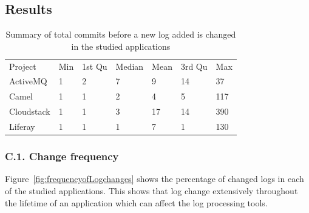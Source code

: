 %	



%	





\subsection{Results}

\begin{table}[tb]
	\centering
	\caption{Summary of total commits before a new log added is changed in the studied applications}
	
	\begin{tabular}{lllllll}
			\cline{1-7}
		Project    & Min & 1st Qu & Median & Mean & 3rd Qu & Max \\
		\cline{1-7}
		ActiveMQ   & 1   & 2      & 7      & 9    & 14     & 37  \\
		Camel      & 1   & 1      & 2      & 4    & 5      & 117 \\
		Cloudstack & 1   & 1      & 3      & 17   & 14     & 390 \\
		Liferay    & 1   & 1      & 1      & 7    & 1      & 130\\	\cline{1-7}
		
	\end{tabular}
	\label{tba:summaryofnewLogchange}
\end{table}


\subsubsection*{C.1. Change frequency}
Figure~\ref{fig:frequencyofLogchanges} shows the percentage of changed logs in each of the studied applications. This shows that log change extensively throughout the lifetime of an application which can affect the log processing tools.

